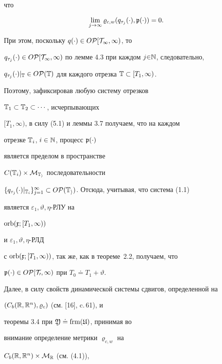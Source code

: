 что


\begin{equation}


\lim_{j\to\infty}\varrho_{c,w}(q_{\tau_j}(\cdot),\frak p(\cdot))=0.


\end{equation}


При этом, поскольку $q(\cdot)\in O\cal P[T_1,\infty)$, то


$q_{\tau_j}(\cdot)\in


O\cal P[T_1,\infty)$ по лемме 4.3 при каждом $j{\in}\Bbb N$, следовательно,


$q_{\tau_j}(\cdot)|_{\Bbb T}\in


O\cal P(\Bbb T)$ для каждого отрезка $\Bbb T\subset[T_1,\infty)$.


Поэтому, зафиксировав любую систему отрезков


$\Bbb T_1\subset\Bbb T_2\subset\dotsb$, исчерпывающих


$[T_1,\infty)$, в силу (5.1) и леммы 3.7 получаем, что на каждом


отрезке $\Bbb T_i$, $i\in\Bbb N$, процесс $\frak p(\cdot)$


является пределом в пространстве


$C(\Bbb T_i)\times\cal M_{\Bbb T_i}$ последовательности


$\{q_{\tau_j}(\cdot)|_{\Bbb T_i}\}_{j=1}^{\infty}


\subset O\cal P(\Bbb T_i)$. Отсюда, учитывая, что система (1.1)


является $\varepsilon_1,\vartheta,\eta$-РЛУ на


$\operatorname{orb}(\frak x;[T_1,\infty))$


и $\varepsilon_1,\vartheta,\eta$-РЛД


с $\operatorname{orb}(\frak x;[T_1,\infty))$, так же, как в теореме~2.2, получаем, что


$\frak p(\cdot)\in O\cal P[T_0,\infty)$ при $T_0\doteq T_1+\vartheta$.





Далее, в силу свойств динамической системы сдвигов, определенной на


$(C_b(\Bbb R,\Bbb R^n),\varrho_c)$ (см. [16], c.\,61), и


теоремы 3.4 при $\frak Y\doteq\operatorname{frm}(\frak U)$, принимая во


внимание определение метрики $\varrho_{c,w}$ на


$C_b(\Bbb R,\Bbb R^n)\times\cal M_{\Bbb R}$ (см. (4.1)),


